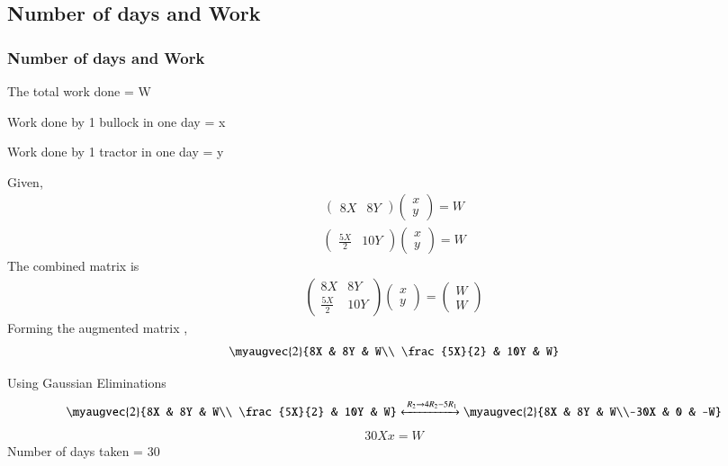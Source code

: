 \documentclass{beamer}
\theoremstyle{remark}
\newcommand{\myvec}[1]{\ensuremath{\begin{pmatrix}#1\end{pmatrix}}}
\numberwithin{equation}{section}
\numberwithin{equation}{section}
\begin{document}
\subsection{Number of days and Work}
\begin{frame}
\frametitle{Number of days and Work}
The total work done = W

Work done by 1 bullock in one day = x

Work done by 1 tractor in one day = y

Given,
\begin{align}
\myvec{8X&8Y}\myvec{x\\y} = W
\end{align}
\begin{align}
\myvec{\frac{5X}{2}&10Y}\myvec{x\\y} = W
\end{align}
The combined matrix is
\begin{align}
\myvec{8X&8Y\\
        \frac{5X}{2}&10Y}\myvec{x\\y} = \myvec{W\\W}
\end{align}
Forming the augmented matrix ,
\begin{align}
  \myaugvec{2}{8X & 8Y & W\\ \frac{5X}{2} & 10Y & W}
\end{align}
\end{frame}
\begin{frame}
Using Gaussian Eliminations
\begin{align}
\myaugvec{2}{8X & 8Y & W\\ \frac{5X}{2} & 10Y & W} 
\xleftrightarrow{\;R_2 \to 4R_2 -5R_1}
 \myaugvec{2}{8X & 8Y & W\\-30X & 0 & -W} 
\end{align}
\begin{align}
30Xx = W
\end{align}
Number of days taken = 30

\end{frame}
\end{document}
